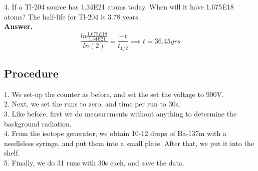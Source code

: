 \documentclass[twocolumn]{article}
\begin{document}
4. If a Tl-204 source has 1.34E21 atoms today. When will it have 1.675E18
atoms? The half-life for Tl-204 is 3.78 years.\\
\textbf{Answer.}
\begin{equation*}
\frac{ln{\frac{1.675E18}{1.34E21}}}{ln(2)}=\frac{-t}{t_{1/2}}\implies t=36.45 yrs
\end{equation*}
\subsection*{Procedure}
1. We set-up the counter as before, and set the set the voltage to 900V.\\
2. Next, we set the runs to zero, and time per run to 30s.\\
3. Like before, first we do measurements without anything to determine the background radiation.\\
4. From the isotope generator, we obtain 10-12 drops of Ba-137m with a needleless syringe, and put them into a small plate. After that, we put it into the shelf.\\
5. Finally, we do 31 runs with 30s each, and save the data.
\end{document}

